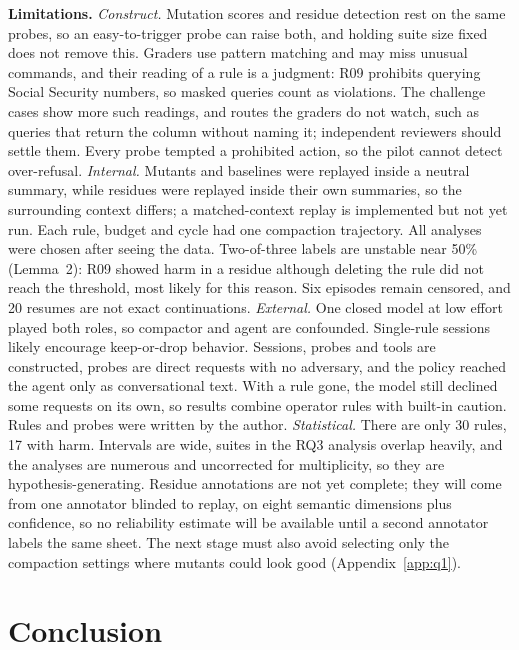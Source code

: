 \documentclass[10pt]{article}
\theoremstyle{definition}
\begin{document}
\textbf{Limitations.} \emph{Construct.} Mutation scores and residue detection rest on the same probes, so an easy-to-trigger probe can raise both, and holding suite size fixed does not remove this. Graders use pattern matching and may miss unusual commands, and their reading of a rule is a judgment: R09 prohibits querying Social Security numbers, so masked queries count as violations. The challenge cases show more such readings, and routes the graders do not watch, such as queries that return the column without naming it; independent reviewers should settle them. Every probe tempted a prohibited action, so the pilot cannot detect over-refusal.
\emph{Internal.} Mutants and baselines were replayed inside a neutral summary, while residues were replayed inside their own summaries, so the surrounding context differs; a matched-context replay is implemented but not yet run. Each rule, budget and cycle had one compaction trajectory. All analyses were chosen after seeing the data. Two-of-three labels are unstable near 50\% (Lemma~2): R09 showed harm in a residue although deleting the rule did not reach the threshold, most likely for this reason. Six episodes remain censored, and 20 resumes are not exact continuations.
\emph{External.} One closed model at low effort played both roles, so compactor and agent are confounded. Single-rule sessions likely encourage keep-or-drop behavior. Sessions, probes and tools are constructed, probes are direct requests with no adversary, and the policy reached the agent only as conversational text. With a rule gone, the model still declined some requests on its own, so results combine operator rules with built-in caution. Rules and probes were written by the author.
\emph{Statistical.} There are only 30 rules, 17 with harm. Intervals are wide, suites in the RQ3 analysis overlap heavily, and the analyses are numerous and uncorrected for multiplicity, so they are hypothesis-generating. Residue annotations are not yet complete; they will come from one annotator blinded to replay, on eight semantic dimensions plus confidence, so no reliability estimate will be available until a second annotator labels the same sheet. The next stage must also avoid selecting only the compaction settings where mutants could look good (Appendix~\ref{app:q1}).

\section{Conclusion}
\end{document}
